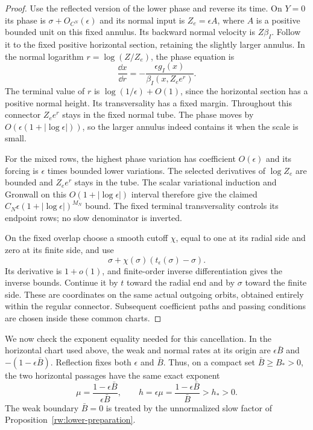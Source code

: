 \begin{proof}
Use the reflected version of the lower phase and reverse its time.
On $Y=0$ its phase is $\sigma+O_{C^N}(\epsilon)$ and its normal
input is $Z_e=\epsilon A$, where $A$ is a positive bounded unit on
this fixed annulus. Its backward normal velocity is $Z\beta_I$.
Follow it to the fixed positive horizontal section, retaining the
slightly larger annulus. In the normal logarithm
$r=\log(Z/Z_e)$, the phase equation is
\[
 \frac{\dd x}{\dd r}
   =-\frac{\epsilon g_I(x)}{\beta_I(x,Z_e e^r)}.
\]
The terminal value of $r$ is $\log(1/\epsilon)+O(1)$, since the
horizontal section has a positive normal height. Its transversality
has a fixed margin. Throughout this connector $Z_e e^r$ stays in
the fixed normal tube. The phase moves by
$O(\epsilon(1+|\log\epsilon|))$, so the larger annulus indeed
contains it when the scale is small.

For the mixed rows, the highest phase variation has coefficient
$O(\epsilon)$ and its forcing is $\epsilon$ times bounded lower
variations. The selected derivatives of $\log Z_e$ are bounded and
$Z_e e^r$ stays in the tube. The scalar variational induction and
Gronwall on this $O(1+|\log\epsilon|)$ interval therefore give the
claimed $C_N\epsilon(1+|\log\epsilon|)^{M_N}$ bound. The fixed
terminal transversality controls its endpoint rows; no slow denominator
is inverted.

On the fixed overlap choose a smooth cutoff $\chi$, equal to one
at its radial side and zero at its finite side, and use
\[
 \sigma+\chi(\sigma)(t_\epsilon(\sigma)-\sigma).
\]
Its derivative is $1+o(1)$, and finite-order inverse differentiation
gives the inverse bounds. Continue it by $t$ toward the radial end
and by $\sigma$ toward the finite side. These are coordinates on
the same actual outgoing orbits, obtained entirely within the regular
connector. Subsequent coefficient paths and passing conditions are
chosen inside these common charts.
\end{proof}

We now check the exponent equality needed for this cancellation.
In the horizontal chart used above, the weak and normal
rates at its origin are $\epsilon\bar B$ and $-(1-\epsilon\bar B)$.
Reflection fixes both $\epsilon$ and $\bar B$. Thus, on a compact set
$\bar B\ge B_*>0$, the two horizontal passages have the same exact
exponent
\begin{equation}\label{rw:transitions:equal-exponents}
 \mu=\frac{1-\epsilon\bar B}{\epsilon\bar B},\qquad
 h=\epsilon\mu=\frac{1-\epsilon\bar B}{\bar B}>h_*>0.
\end{equation}
The weak boundary $\bar B=0$ is treated by the unnormalized slow
factor of Proposition~\ref{rw:lower-preparation}.

